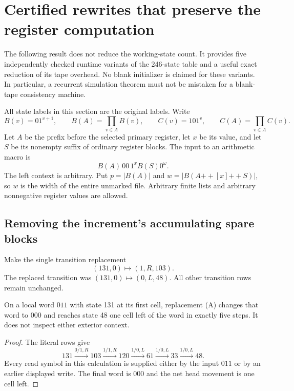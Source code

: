 \section{Certified rewrites that preserve the register computation}
\label{sec:neutral-macros}

The following result does not reduce the working-state count.  It provides
five independently checked runtime variants of the 246-state table and a
useful exact reduction of its tape overhead.  No blank initializer is
claimed for these variants.  In particular, a recurrent simulation theorem
must not be mistaken for a blank-tape consistency machine.

All state labels in this section are the original labels.  Write
\[
 B(v)=01^{v+1},\qquad B(A)=\prod_{v\in A}B(v),\qquad
 C(v)=101^v,\qquad C(A)=\prod_{v\in A}C(v).
\]
Let $A$ be the prefix before the selected primary register, let $x$ be its
value, and let $S$ be its nonempty suffix of ordinary register blocks.
The input to an arithmetic macro is
\[
 B(A)\,00\,1^x B(S)0^\omega.
\]
The left context is arbitrary.  Put $p=|B(A)|$ and
$w=|B(A\mathbin{+\!+}[x]\mathbin{+\!+}S)|$, so $w$ is the
width of the entire unmarked file.  Arbitrary finite lists and arbitrary
nonnegative register values are allowed.

\subsection{Removing the increment's accumulating spare blocks}

Make the single transition replacement
\[
 (131,0)\mapsto (1,R,103).
 \tag{A}
\]
The replaced transition was $(131,0)\mapsto(0,L,48)$.
All other transition rows remain unchanged.

\begin{lemma}
On a local word $011$ with state 131 at its first cell, replacement
\textup{(A)} changes that word to $000$ and reaches state 48 one cell
left of the word in exactly five steps.  It does not inspect either
exterior context.
\end{lemma}
\begin{proof}
The literal rows give
\[
 131\xrightarrow{0/1,R}103
 \xrightarrow{1/1,R}120
 \xrightarrow{1/0,L}61
 \xrightarrow{1/0,L}33
 \xrightarrow{1/0,L}48.
\]
Every read symbol in this calculation is supplied either by the input
$011$ or by an earlier displayed write.  The final word is $000$ and
the net head movement is one cell left.
\end{proof}

